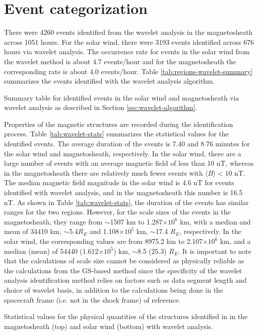 \section{Event categorization}
There were 4260 events identified from the wavelet analysis in the magnetosheath across 1051 hours. For the solar wind, there were 3193 events identified across 676 hours via wavelet analysis. The occurrence rate for events in the solar wind from the wavelet method is about 4.7 events/hour and for the magnetosheath the corresponding rate is about 4.0 events/hour. Table  \ref{tab:regions-wavelet-summary} summarizes the events identified with the wavelet analysis algorithm.
\begin{table}
    \centering
    \caption{Summary table for identified events in the solar wind and magnetosheath via wavelet analysis as described in Section \ref{sec:wavelet-algorithm}.}
    
    \label{tab:regions-wavelet-summary}
\end{table}

Properties of the magnetic structures are recorded during the identification process. Table \ref{tab:wavelet-stats} summarizes the statistical values for the identified events. The average duration of the events is 7.40 and 8.76 minutes for the solar wind and magnetosheath, respectively. In the solar wind, there are a large number of events with an average magnetic field of less than 10 nT, whereas in the magnetosheath there are relatively much fewer events with $\langle B\rangle < 10$ nT. The median magnetic field magnitude in the solar wind is 4.6 nT for events identified with wavelet analysis, and in the magnetosheath this number is 16.5 nT. As shown in Table \ref{tab:wavelet-stats}, the duration of the events has similar ranges for the two regions. However, for the scale sizes of the events in the magnetosheath, they range from $\sim$1507 km to 1.287$\times 10^6$ km, with a median and mean of 34410 km, $\sim$5.4$R_E$ and 1.108$\times 10^5$ km, $\sim$17.4 $R_E$, respectively. In the solar wind, the corresponding values are from 8975.2 km to 2.107$\times 10^6$ km, and a median (mean) of 54440 (1.612$\times 10^5$) km, $\sim$8.5 (25.3) $R_E$. It is important to note that the calculations of scale size cannot be considered as physically reliable as the calculations from the GS-based method since the specificity of the wavelet analysis identification method relies on factors such as data segment length and choice of wavelet basis, in addition to the calculations being done in the spacecraft frame (i.e. not in the shock frame) of reference.
\begin{table}
    \centering
    \caption[Statistical values for the physical quantities of structures identified with wavelet analysis]{Statistical values for the physical quantities of the structures identified in in the magnetosheath (top) and solar wind (bottom) with wavelet analysis.}
    
    \label{tab:wavelet-stats}
\end{table}

